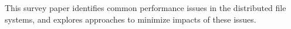 
This survey paper identifies common performance issues in 
the distributed file systems, 
and explores approaches to minimize impacts of these issues.

